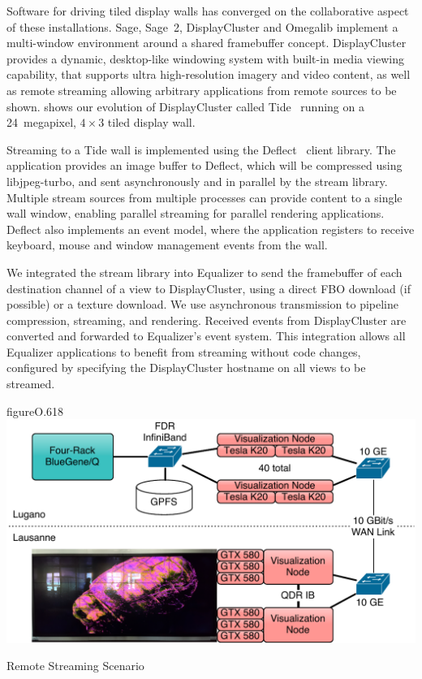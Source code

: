 Software for driving tiled display walls has converged on the collaborative
aspect of these installations. Sage, Sage~2, DisplayCluster and Omegalib
implement a multi-window environment around a shared framebuffer concept.
DisplayCluster provides a dynamic, desktop-like windowing system with built-in
media viewing capability, that supports ultra high-resolution imagery and video
content, as well as remote streaming allowing arbitrary applications from
remote sources to be shown.  shows our evolution of DisplayCluster
called Tide~\cite{tide} running on a 24~megapixel, $4\times 3$ tiled display
wall.

Streaming to a Tide wall is implemented using the Deflect~\cite{deflect} client
library. The application provides an image buffer to Deflect, which will be
compressed using libjpeg-turbo, and sent asynchronously and in parallel by the
stream library. Multiple stream sources from multiple processes can provide
content to a single wall window, enabling parallel streaming for parallel
rendering applications. Deflect also implements an event model, where the
application registers to receive keyboard, mouse and window management events
from the wall.

We integrated the stream library into Equalizer to send the framebuffer of each
destination channel of a view to DisplayCluster, using a direct FBO download
(if possible) or a texture download. We use asynchronous transmission to
pipeline compression, streaming, and rendering. Received events from
DisplayCluster are converted and forwarded to Equalizer’s event system. This
integration allows all Equalizer applications to benefit from streaming without
code changes, configured by specifying the DisplayCluster hostname on all views
to be streamed.

\begin{wrapfloat}{figure}{O}{.618\textwidth}
  \includegraphics[width=.618\textwidth]{images/tideSetup}
  {\caption{\label{fTideSetup}Remote Streaming Scenario}}
\end{wrapfloat}

